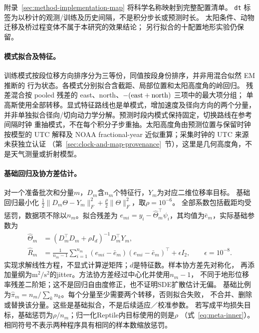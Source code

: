 \documentclass[UTF8,11pt]{ctexart}
\begin{document}
\noindent 附录~\ref{sec:method-implementation-map} 将科学名称映射到完整配置清单。
\texttt{dt} 标签为以秒计的观测/训练及历史间隔，不是积分步长或预测时长。
太阳条件、动物迁移及桥过程变体不属于本研究的效果结论；
另行拟合的十配置地形实验仍保留。

\paragraph{模式拟合及特征。}
训练模式按段位移方向排序分为三等份，同值按段身份排序，并非用混合似然 EM 推断的
行为状态。各模式分别拟合含截距、局部位置和太阳高度角的岭回归。
残差混合按 pooled 残差的 east、north、\(-({\rm east}+{\rm north})\) 三项中的最大项分组；
单高斯使用全部转移。显式特征路线也是单模式，增加速度及径向方向的两个分量，
并非单独拟合径向/切向动力学分解。预测时段内模式保持固定，切换路线在参考间隔时钟
重抽模式，不在每个积分子步重抽。太阳高度角由预测位置与保留时钟按模型的 UTC 解释及 NOAA
fractional-year 近似重算\cite{noaa}；采集时钟的 UTC 来源未获独立认证
（第~\ref{sec:clock-and-map-provenance}~节），这里是几何高度角，不是天气测量或折射模型。

\paragraph{基础回归及协方差估计。}
\label{sec:method-base-fit}
对一个准备批次和分量\(m\)，\(D_m\)含\(n_m\)个特征行，\(Y_m\)为对应二维位移率目标。
基础回归最小化
\(\tfrac12\|D_m\Theta-Y_m\|_F^2+\tfrac\rho2\|\Theta\|_F^2\)，取\(\rho=10^{-6}\)。
全部系数包括截距均受惩罚，数据项不除以\(n_m\)。拟合残差为
\(e_{mi}=y_i-\widehat\Theta_m^\top\psi_i\)，其均值为\(\bar e_m\)，实际基础参数为
\begin{align}
 \widehat\Theta_m&=(D_m^\top D_m+\rho I_d)^{-1}D_m^\top Y_m,
 \label{eq:method-base-ridge}\\
 \widehat R_m&=\frac1{n_m-1}\sum_{i=1}^{n_m}
 (e_{mi}-\bar e_m)(e_{mi}-\bar e_m)^\top+\epsilon I_2,
 \qquad \epsilon=10^{-8}.
 \label{eq:method-base-covariance}
\end{align}
实现求解线性方程，不显式计算逆矩阵；\(d\)是特征数。样本协方差先对称化，
再添加量纲为\(\mathrm{m}^2/\mathrm{s}^2\)的jitter。方法协方差经过中心化并使用\(n_m-1\)，
不同于地形位移率残差二阶矩；这不是回归自由度修正，也不证明SDE扩散估计无偏。
基础比例为\(\widehat\pi_m=n_m/\sum_k n_k\)。每个分量至少需要两个转移，否则拟合失败，
不合并、删除或替换该分量。这些是基础拟合，不是后续适应／校准参数。
若写成平均损失目标，基础惩罚为\(\rho/n_m\)；归一化Reptile内目标使用的则是\(\rho\)
（式~\eqref{eq:meta-inner}）。相同符号不表示两种程序具有相同的样本数缩放惩罚。
\end{document}
